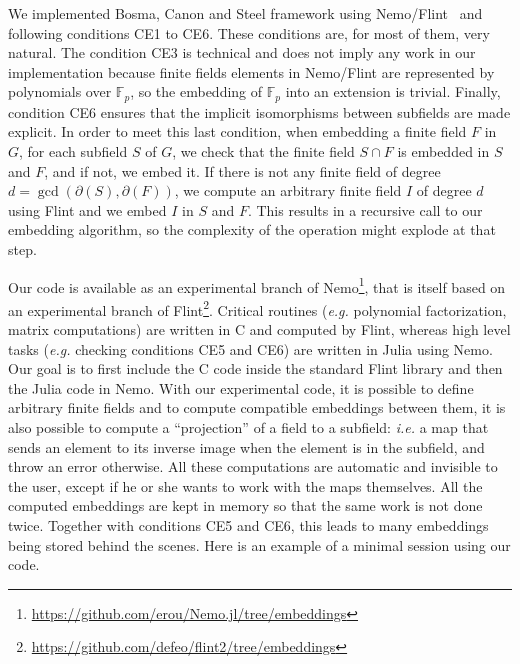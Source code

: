 \documentclass[12pt]{article}
\newcommand{\dF}{\partial(F)}
\newcommand{\eg}{\emph{e.g. }}
\newcommand{\ie}{\emph{i.e. }}
\begin{document}
We implemented Bosma, Canon and Steel framework using Nemo/Flint~\cite{Nemo,
Flint} and following conditions CE1 to CE6. These
conditions are, for most of them, very natural. The condition CE3 is
technical and does not imply any work in our implementation because
finite fields elements in Nemo/Flint are represented by
polynomials over $\mathbb{F}_p$, so the embedding of $\mathbb{F}_p$ into an
extension is trivial. Finally, condition
CE6 ensures that the implicit isomorphisms between subfields are made
explicit. In order to meet this last condition, when embedding a finite field
$F$ in $G$, for each subfield $S$ of $G$, we check that the finite field $S\cap F$ is 
embedded in $S$ and $F$, and if not, we embed it. If there is not
any finite field of degree $d=\gcd(\partial(S), \dF)$, we compute an
arbitrary finite field $I$ of degree $d$ using Flint
and we embed $I$ in $S$ and $F$. This results in a recursive call to our
embedding algorithm, so the complexity of the operation might explode at that step.

Our code is available as an experimental branch of
Nemo\footnote{\url{https://github.com/erou/Nemo.jl/tree/embeddings}}, that is
itself based on an experimental branch of
Flint\footnote{\url{https://github.com/defeo/flint2/tree/embeddings}}. Critical
routines (\eg polynomial factorization, matrix computations) are written in C and
computed by Flint, whereas high level tasks (\eg checking conditions CE5 and CE6) are
written in Julia using Nemo. Our goal is to first include the C code inside the
standard Flint library and then the Julia code in Nemo.
With our experimental code, it is possible to define arbitrary finite fields and
to compute compatible embeddings between them, it is also possible to compute a ``projection'' of a
field to a subfield: \ie a map that sends an element to its inverse image when
the element is in the subfield, and throw an error otherwise. All these
computations are automatic and invisible to the user, except if he or she wants
to work with the maps themselves. All the computed embeddings are kept in
memory so that the same work is not done twice. Together with conditions CE5 and
CE6, this leads to many embeddings being stored behind the scenes. Here is an
example of a minimal session using our code.
\end{document}
